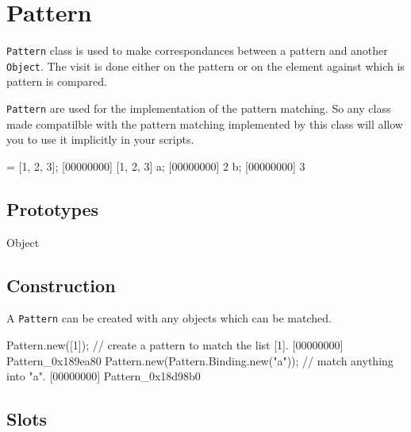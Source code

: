 \section{Pattern}

\lstinline|Pattern| class is used to make correspondances between a pattern
and another \lstinline|Object|.  The visit is done either on the pattern or
on the element against which is pattern is compared.

\lstinline|Pattern| are used for the implementation of the pattern matching.
So any class made compatilble with the pattern matching implemented by this
class will allow you to use it implicitly in your scripts.

\begin{urbiscript} = [1, 2, 3];
[00000000] [1, 2, 3]
a;
[00000000] 2
b;
[00000000] 3
\end{urbiscript}

\subsection{Prototypes}

\begin{refObjects}
\item[Object]
\end{refObjects}

\subsection{Construction}

A \lstinline|Pattern| can be created with any objects which can be matched.

\begin{urbiscript}
Pattern.new([1]); // create a pattern to match the list [1].
[00000000] Pattern_0x189ea80
Pattern.new(Pattern.Binding.new("a")); // match anything into "a".
[00000000] Pattern_0x18d98b0
\end{urbiscript}

\subsection{Slots}

